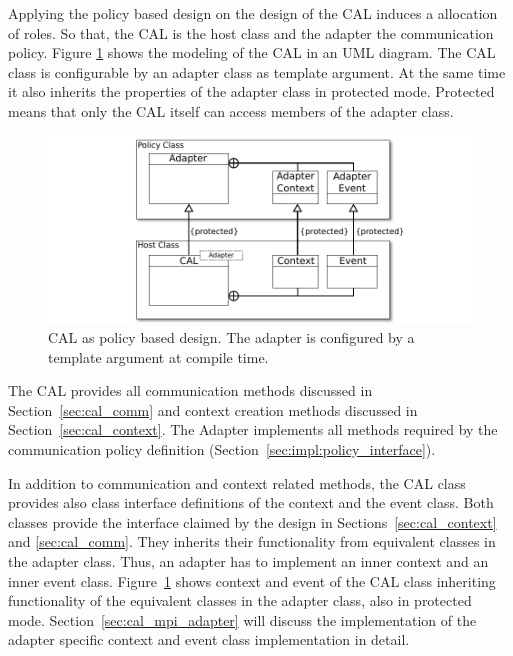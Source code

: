 Applying the policy based design on the design of the CAL induces a
allocation of roles. So that, the CAL is the host class and the
adapter the communication policy. Figure \ref{fig:cal_uml} shows the
modeling of the CAL in an UML diagram. The CAL class is configurable
by an adapter class as template argument. At the same time it also
inherits the properties of the adapter class in protected
mode. Protected means that only the CAL itself can access members of
the adapter class.

\begin{figure}[H]
  \centering \includegraphics[width=\textwidth]{graphics/40_cal_uml}
  \caption{CAL as policy based design. The adapter is configured by a
    template argument at compile time.}
  \label{fig:cal_uml}
\end{figure}

The CAL provides all communication methods discussed in
Section~\ref{sec:cal_comm} and context creation methods discussed in
Section~\ref{sec:cal_context}. The Adapter implements all methods
required by the communication policy definition
(Section~\ref{sec:impl:policy_interface}).

In addition to communication and context related methods, the CAL
class provides also class interface definitions of the context and the
event class. Both classes provide the interface claimed by the design
in Sections~\ref{sec:cal_context} and \ref{sec:cal_comm}. They
inherits their functionality from equivalent classes in the adapter
class. Thus, an adapter has to implement an inner context and an inner
event class.  Figure~\ref{fig:cal_uml} shows context and event of the
CAL class inheriting functionality of the equivalent classes in the
adapter class, also in protected
mode. Section~\ref{sec:cal_mpi_adapter} will discuss the
implementation of the adapter specific context and event class
implementation in detail.

